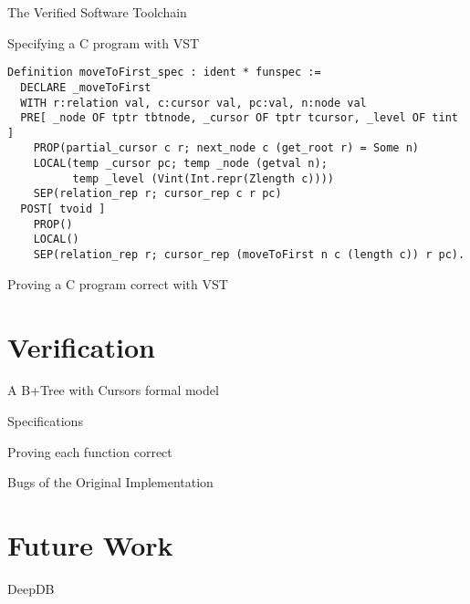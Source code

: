 \documentclass[page number,usenames,dvipsnames]{beamer}
\begin{document}
\begin{frame}{The Verified Software Toolchain}

  
\end{frame}

\begin{frame}[fragile]{Specifying a C program with VST}
 \begin{lstlisting}[language=Coq,basicstyle=\scriptsize]
Definition moveToFirst_spec : ident * funspec :=
  DECLARE _moveToFirst
  WITH r:relation val, c:cursor val, pc:val, n:node val
  PRE[ _node OF tptr tbtnode, _cursor OF tptr tcursor, _level OF tint ]
    PROP(partial_cursor c r; next_node c (get_root r) = Some n)
    LOCAL(temp _cursor pc; temp _node (getval n);
          temp _level (Vint(Int.repr(Zlength c))))
    SEP(relation_rep r; cursor_rep c r pc)
  POST[ tvoid ]
    PROP()
    LOCAL()
    SEP(relation_rep r; cursor_rep (moveToFirst n c (length c)) r pc).
\end{lstlisting}
\end{frame}


\begin{frame}{Proving a C program correct with VST}

  
\end{frame}

\section{Verification}
\begin{frame}{A B+Tree with Cursors formal model}

  
\end{frame}

\begin{frame}{Specifications}

\end{frame}

\begin{frame}{Proving each function correct}


\end{frame}

\begin{frame}{Bugs of the Original Implementation}
  
\end{frame}

\section{Future Work}
\begin{frame}{DeepDB}

\end{frame}
  
\end{document}
